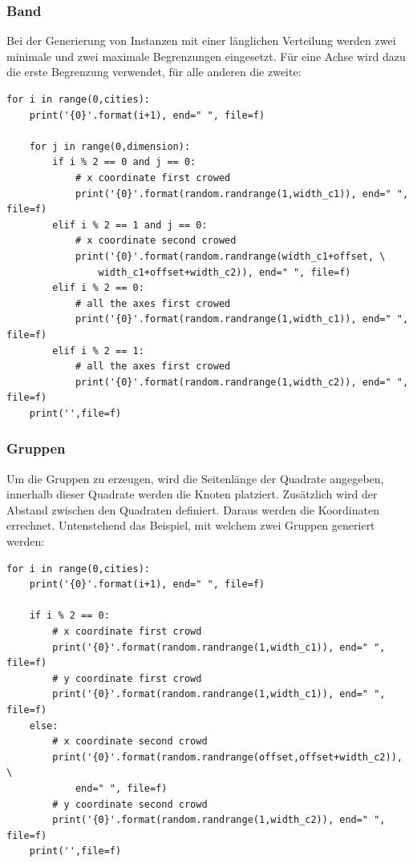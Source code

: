 \documentclass[11pt,a4paper]{article}
\begin{document}
\subsubsection{Band}
Bei der Generierung von Instanzen mit einer länglichen Verteilung werden zwei minimale und zwei maximale Begrenzungen eingesetzt. Für eine Achse wird dazu die erste Begrenzung verwendet, für alle anderen die zweite:

\begin{verbatim}
for i in range(0,cities):
    print('{0}'.format(i+1), end=" ", file=f)

    for j in range(0,dimension):
        if i % 2 == 0 and j == 0:
            # x coordinate first crowed
            print('{0}'.format(random.randrange(1,width_c1)), end=" ", file=f)
        elif i % 2 == 1 and j == 0:
            # x coordinate second crowed
            print('{0}'.format(random.randrange(width_c1+offset, \
                width_c1+offset+width_c2)), end=" ", file=f) 
        elif i % 2 == 0:
            # all the axes first crowed
            print('{0}'.format(random.randrange(1,width_c1)), end=" ", file=f)
        elif i % 2 == 1:
            # all the axes first crowed
            print('{0}'.format(random.randrange(1,width_c2)), end=" ", file=f)
    print('',file=f)
\end{verbatim}

\subsubsection{Gruppen}
Um die Gruppen zu erzeugen, wird die Seitenlänge der Quadrate angegeben, innerhalb dieser Quadrate werden die Knoten platziert. Zusätzlich wird der Abstand zwischen den Quadraten definiert. Daraus werden die Koordinaten errechnet. Untenstehend das Beispiel, mit welchem zwei Gruppen generiert werden:

\begin{verbatim}
for i in range(0,cities):
    print('{0}'.format(i+1), end=" ", file=f)

    if i % 2 == 0:
        # x coordinate first crowd
        print('{0}'.format(random.randrange(1,width_c1)), end=" ", file=f)
        # y coordinate first crowd
        print('{0}'.format(random.randrange(1,width_c1)), end=" ", file=f)
    else:
        # x coordinate second crowd
        print('{0}'.format(random.randrange(offset,offset+width_c2)), \
            end=" ", file=f)
        # y coordinate second crowd
        print('{0}'.format(random.randrange(1,width_c2)), end=" ", file=f)
    print('',file=f)
\end{verbatim}
\end{document}
